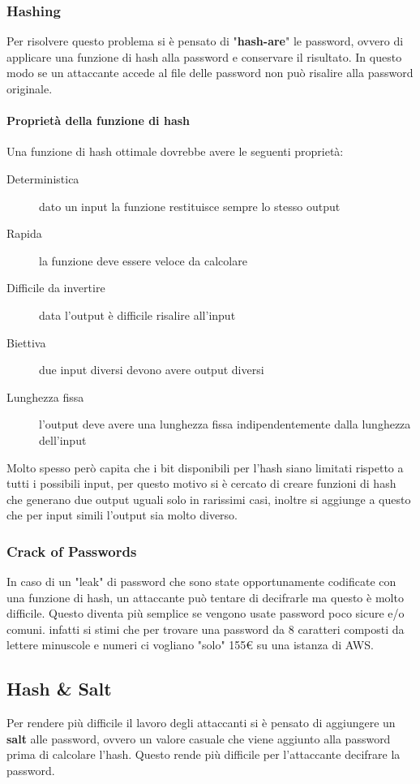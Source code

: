         \subsubsection{Hashing}
            Per risolvere questo problema si è pensato di "\textbf{hash-are}" le password, ovvero di applicare una funzione di hash alla password e conservare il risultato. In questo modo se un attaccante accede al file delle password non può risalire alla password originale.
            \paragraph{Proprietà della funzione di hash}
                Una funzione di hash ottimale dovrebbe avere le seguenti proprietà:
                \begin{description}
                    \item[Deterministica] dato un input la funzione restituisce sempre lo stesso output
                    \item[Rapida] la funzione deve essere veloce da calcolare
                    \item[Difficile da invertire] data l'output è difficile risalire all'input
                    \item[Biettiva] due input diversi devono avere output diversi
                    \item[Lunghezza fissa] l'output deve avere una lunghezza fissa indipendentemente dalla lunghezza dell'input
                \end{description}
                Molto spesso però capita che i bit disponibili per l'hash siano limitati rispetto a tutti i possibili input, per questo motivo si è cercato di creare funzioni di hash che generano due output uguali solo in rarissimi casi, inoltre si aggiunge a questo che per input simili l'output sia molto diverso.
            \subsubsection{Crack of Passwords}
                In caso di un "leak" di password che sono state opportunamente codificate con una funzione di hash, un attaccante può tentare di decifrarle ma questo è molto difficile. Questo diventa più semplice se vengono usate password poco sicure e/o comuni. infatti si stimi che per  trovare una password da 8 caratteri composti da lettere minuscole e numeri ci vogliano "solo" 155€ su una istanza di AWS.
        \subsection{Hash \& Salt}
            Per rendere più difficile il lavoro degli attaccanti si è pensato di aggiungere un \textbf{salt} alle password, ovvero un valore casuale che viene aggiunto alla password prima di calcolare l'hash. Questo rende più difficile per l'attaccante decifrare la password.
